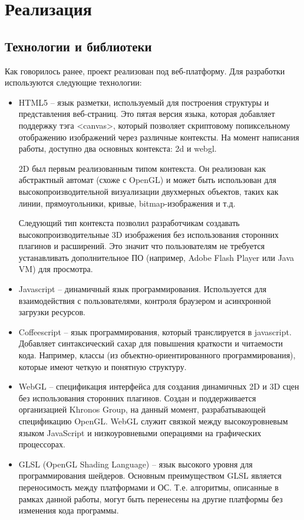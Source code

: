 \newpage
\section{Реализация}

\subsection{Технологии и библиотеки}

Как говорилось ранее, проект реализован под веб-платформу. Для разработки используются следующие технологии:

\begin{itemize}
  \item HTML5 -- язык разметки, используемый для построения структуры и представления веб-страниц. 
    Это пятая версия языка, которая добавляет поддержку тэга \textless{}canvas\textgreater{}, 
    который позволяет скриптовому попиксельному отображению изображений через различные контексты. 
    На момент написания работы, доступно два основных контекста: 2d и webgl.

    2D был первым реализованным типом контекста. Он реализован как абстрактный автомат (схоже 
    с OpenGL) и может быть использован для высокопроизводительной визуализации двухмерных объектов, 
    таких как линии, прямоугольники, кривые, bitmap-изображения и т.д.

    Следующий тип контекста позволил разработчикам создавать высокопроизводительные 3D изображения 
    без использования сторонних плагинов и расширений. Это значит что пользователям не требуется 
    устанавливать дополнительное ПО (например, Adobe Flash Player или Java VM) для просмотра.

  \item Javascript -- динамичный язык программирования. Используется для взаимодействия с 
    пользователями, контроля браузером и асинхронной загрузки ресурсов.

  \item Coffeescript -- язык программирования, который транслируется в javascript. Добавляет 
    синтаксический сахар для повышения краткости и читаемости кода. Например, классы 
    (из объектно-ориентированного программирования), которые имеют четкую и понятную структуру.

  \item WebGL -- спецификация интерфейса для создания динамичных 2D и 3D сцен без использования 
    сторонних плагинов. Создан и поддерживается организацией Khronos Group, на данный момент, 
    разрабатывающей спецификацию OpenGL. WebGL служит связкой между высокоуровневым языком 
    JavaScript и низкоуровневыми операциями на графических процессорах.

  \item GLSL (OpenGL Shading Language) -- язык высокого уровня для программирования шейдеров. 
    Основным преимуществом GLSL является переносимость между платформами и ОС. Т.е. алгоритмы, 
    описанные в рамках данной работы, могут быть перенесены на другие платформы без изменения 
    кода программы.
\end{itemize}

